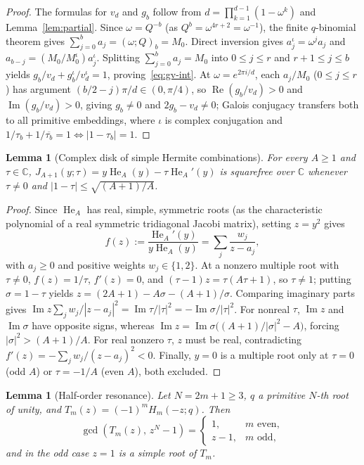 \documentclass[11pt,reqno]{amsart}
\numberwithin{equation}{section}
\newtheorem{lemma}[theorem]{Lemma}
\theoremstyle{definition}
\theoremstyle{remark}
\newcommand{\C}{\mathbb{C}}
\newcommand{\He}{\operatorname{He}}
\newcommand{\poch}[3]{(#1;#2)_{#3}}
\begin{document}
\begin{proof}
The formulas for $v_d$ and $g_b$ follow from $d=\prod_{k=1}^{d-1}(1-\omega^k)$ and Lemma~\ref{lem:partial}. Since $\omega = Q^{-b}$ (as $Q^b=\omega^{4r+2}=\omega^{-1}$), the finite $q$-binomial theorem gives $\sum_{j=0}^b a_j = \poch{\omega}{Q}{b}=M_0$. Direct inversion gives $a_j^\iota = \omega^j a_j$ and $a_{b-j}=(M_0/M_0^\iota)a_j^\iota$. Splitting $\sum_{j=0}^b a_j=M_0$ into $0\le j\le r$ and $r+1\le j\le b$ yields $g_b/v_d + g_b^\iota/v_d^\iota = 1$, proving~\eqref{eq:gv-int}. At $\omega=e^{2\pi i/d}$, each $a_j/M_0$ ($0\le j\le r$) has argument $(b/2-j)\pi/d\in(0,\pi/4)$, so $\operatorname{Re}(g_b/v_d)>0$ and $\operatorname{Im}(g_b/v_d)>0$, giving $g_b\neq 0$ and $2g_b-v_d\neq 0$; Galois conjugacy transfers both to all primitive embeddings, where $\iota$ is complex conjugation and $1/\tau_b+1/\overline{\tau_b}=1 \iff |1-\tau_b|=1$.
\end{proof}

\begin{lemma}[Complex disk of simple Hermite combinations]
\label{lem:disk}
For every $A\ge 1$ and $\tau\in\C$, $J_{A+1}(y;\tau)=y\He_A(y)-\tau\He_A'(y)$ is squarefree over $\C$ whenever $\tau\neq 0$ and $|1-\tau|\le \sqrt{(A+1)/A}$.
\end{lemma}

\begin{proof}
Since $\He_A$ has real, simple, symmetric roots (as the characteristic polynomial of a real symmetric tridiagonal Jacobi matrix), setting $z=y^2$ gives
\[
f(z) := \frac{\He_A'(y)}{y\He_A(y)} = \sum_j \frac{w_j}{z-a_j},
\]
with $a_j\ge 0$ and positive weights $w_j\in\{1,2\}$. At a nonzero multiple root with $\tau\neq 0$, $f(z)=1/\tau$, $f'(z)=0$, and $(\tau-1)z=\tau(A\tau+1)$, so $\tau\neq 1$; putting $\sigma=1-\tau$ yields $z = (2A+1) - A\sigma - (A+1)/\sigma$. Comparing imaginary parts gives $\operatorname{Im} z\sum_j w_j/|z-a_j|^2 = \operatorname{Im}\tau/|\tau|^2 = -\operatorname{Im}\sigma/|\tau|^2$. For nonreal $\tau$, $\operatorname{Im}z$ and $\operatorname{Im}\sigma$ have opposite signs, whereas $\operatorname{Im}z = \operatorname{Im}\sigma\bigl((A+1)/|\sigma|^2 - A\bigr)$, forcing $|\sigma|^2 > (A+1)/A$. For real nonzero $\tau$, $z$ must be real, contradicting $f'(z)=-\sum_j w_j/(z-a_j)^2<0$. Finally, $y=0$ is a multiple root only at $\tau=0$ (odd $A$) or $\tau=-1/A$ (even $A$), both excluded.
\end{proof}

\begin{lemma}[Half-order resonance]
\label{lem:resonance}
Let $N=2m+1\ge 3$, $q$ a primitive $N$-th root of unity, and $T_m(z)=(-1)^m H_m(-z;q)$. Then
\[
\gcd(T_m(z),\, z^N-1) = \begin{cases} 1, & m\text{ even},\\ z-1, & m\text{ odd}, \end{cases}
\]
and in the odd case $z=1$ is a simple root of $T_m$.
\end{lemma}
\end{document}
